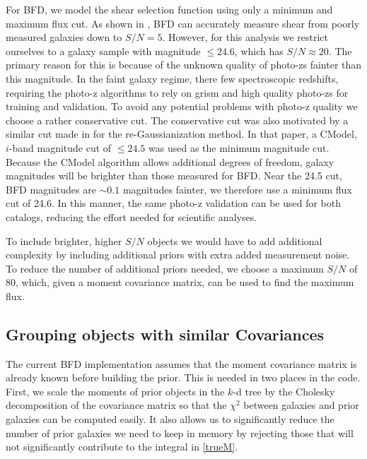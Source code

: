 \documentclass[useAMS,usenatbib]{mnras}
\begin{document}
For BFD, we model the shear selection function using only a minimum and maximum flux cut.  As shown in \cite{Bernstein2016}, BFD can accurately measure shear from poorly measured galaxies down to $S/N=5$. However, for this analysis we restrict ourselves to a galaxy sample with magnitude $\le 24.6$, which has $S/N\approx20$.  The primary reason for this is because of the unknown quality of photo-zs fainter than this magnitude.  In the faint galaxy regime, there few spectroscopic redshifts, requiring the photo-z algorithms to rely on grism and high quality photo-zs for training and validation.  To avoid any potential problems with photo-z quality we choose a rather conservative cut.  The conservative cut was also motivated by a similar cut made in \cite{ShearPaper:inprep} for the re-Gaussianization method.  In that paper, a CModel, $i$-band magnitude cut of $\le 24.5$ was used as the minimum magnitude cut.  Because the CModel algorithm allows additional degrees of freedom, galaxy magnitudes will be brighter than those measured for BFD.  Near the 24.5 cut, BFD magnitudes are $\sim0.1$ magnitudes fainter, we therefore use a minimum flux cut of 24.6.  In this manner, the same photo-z validation can be used for both catalogs, reducing the effort needed for scientific analyses.

To include brighter, higher $S/N$ objects we would have to add additional complexity by including additional priors with extra added measurement noise.  To reduce the number of additional priors needed, we choose a maximum $S/N$ of 80, which, given a moment covariance matrix, can be used to find the maximum flux.




\subsection{Grouping objects with similar Covariances}
The current BFD implementation assumes that the moment covariance matrix is already known before building the prior.  This is needed in two places in the code.  First, we scale the moments of prior objects in the $k$-d tree by the Cholesky decomposition of the covariance matrix so that the $\chi^2$ between galaxies and prior galaxies can be computed easily. It also allows us to significantly reduce the number of prior galaxies we need to keep in memory by rejecting those that will not significantly contribute to the integral in \ref{trueM}.
\end{document}

